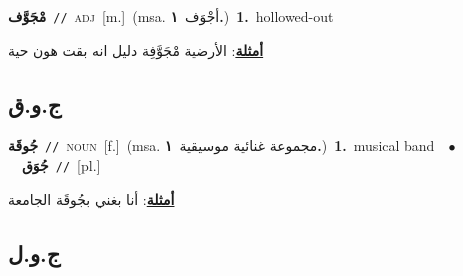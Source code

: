 \documentclass[10pt,a4paper,twoside]{article} %
\begin{document}
\begin{multicols}{2}
{\setlength\topsep{0pt}\textbf{\foreignlanguage{arabic}{مْجَوَّف}}\ {\color{gray}\texttt{//}\color{black}}\ \textsc{adj}\ [m.]\ \color{gray}(msa. \foreignlanguage{arabic}{أجْوَف}~\foreignlanguage{arabic}{\textbf{١.}})\color{black}\ \textbf{1.}~hollowed-out\  \begin{flushright}\color{gray}\foreignlanguage{arabic}{\textbf{\underline{\foreignlanguage{arabic}{أمثلة}}}: الأرضية مْجَوَّفِة دليل انه بقت هون حية}\end{flushright}\color{black}} \vspace{2mm}

\vspace{-3mm}
\subsection*{\color{blue}\foreignlanguage{arabic}{ج.و.ق}\color{blue}{}} 

{\setlength\topsep{0pt}\textbf{\foreignlanguage{arabic}{جُوقَة}}\ {\color{gray}\texttt{//}\color{black}}\ \textsc{noun}\ [f.]\ \color{gray}(msa. \foreignlanguage{arabic}{مجموعة غنائية موسيقية}~\foreignlanguage{arabic}{\textbf{١.}})\color{black}\ \textbf{1.}~musical band\ \ $\bullet$\ \ \setlength\topsep{0pt}\textbf{\foreignlanguage{arabic}{جُوَق}}\ {\color{gray}\texttt{//}\color{black}}\ [pl.]\  \begin{flushright}\color{gray}\foreignlanguage{arabic}{\textbf{\underline{\foreignlanguage{arabic}{أمثلة}}}: أنا بغني بجُوقَة الجامعة}\end{flushright}\color{black}} \vspace{2mm}

\vspace{-3mm}
\subsection*{\color{blue}\foreignlanguage{arabic}{ج.و.ل}\color{blue}{}} 


\end{multicols}
\end{document}

